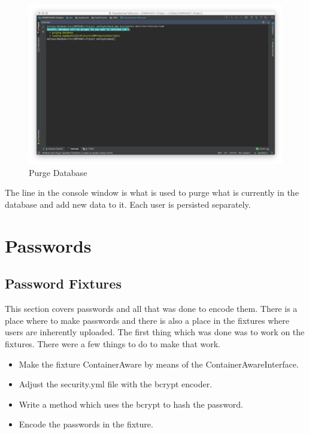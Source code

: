 \begin{figure}[htbp]
   \centering
   \includegraphics[width=400pt]{figures/fixtures_load_purge.png} %
   \caption{Purge Database}
   \label{fig:Purge Database}
\end{figure}

The line in the console window is what is used to purge what is currently in the database and add new data to it. Each user is persisted separately.

\section{Passwords}

\subsection{Password Fixtures}

This section covers passwords and all that was done to encode them. There is a place where to make passwords and there is also a place in the fixtures where users are inherently uploaded. The first thing which was done was to work on the fixtures. There were a few things to do to make that work.

\begin{itemize}
  \item Make the fixture ContainerAware by means of the ContainerAwareInterface.
    \item Adjust the security.yml file with the bcrypt encoder.
      \item Write a method which uses the bcrypt to hash the password.
        \item Encode the passwords in the fixture.
\end{itemize}

